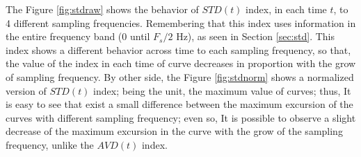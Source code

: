 \documentclass[review]{elsarticle}
\begin{document}
The Figure \ref{fig:stdraw} shows the  behavior of $STD(t)$ index, in each time $t$, 
to 4 different sampling frequencies. Remembering that this index uses information in the entire frequency
band ($0$ until $F_s/2$ Hz), as seen in Section \ref{sec:std}.
This index shows a different behavior across time to each sampling frequency,
so that, the value of the index in each time of curve decreases in proportion with 
the grow of sampling frequency. By other side,
the Figure \ref{fig:stdnorm} shows a normalized version of $STD(t)$ index;
being the unit, the maximum value of curves; thus,
It is easy to see that exist a small difference between the maximum excursion 
of the curves with different sampling frequency; even so, It is possible to observe
a slight decrease of the maximum excursion in the curve with the grow of the sampling frequency, 
unlike the $AVD(t)$ index.
\end{document}
